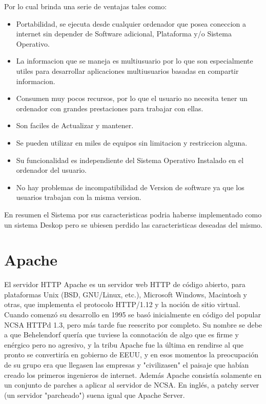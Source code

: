 Por lo cual brinda una serie de ventajas tales como:

\begin{itemize}
    \item Portabilidad, se ejecuta desde cualquier ordenador que posea coneccion a internet sin
        depender de Software adicional, Plataforma y/o Sistema Operativo.
    \item La informacion que se maneja es multiusuario por lo que son especialmente utiles para
        desarrollar aplicaciones multiusuarios basadas en compartir informacion.
    \item Consumen muy pocos recursos, por lo que el usuario no necesita tener un ordenador con 
        grandes prestaciones para trabajar con ellas.
    \item Son faciles de Actualizar y mantener.
    \item Se pueden utilizar en miles de equipos sin limitacion y restriccion alguna.
    \item Su funcionalidad es independiente del Sistema Operativo Instalado en el ordenador del 
            usuario.
    \item No hay problemas de incompatibilidad de Version de software ya que los usuarios trabajan 
        con la misma version.
\end{itemize}
En resumen el Sistema por sus caracteristicas podria haberse implementado como un sistema
Deskop pero se ubiesen perdido las caracteristicas deseadas del mismo.


\section{Apache}

El servidor HTTP Apache es un servidor web HTTP de código abierto, para plataformas
Unix (BSD, GNU/Linux, etc.), Microsoft Windows, Macintosh y otras, que implementa
el protocolo HTTP/1.12 y la noción de sitio virtual. Cuando comenzó su desarrollo en 1995 se basó inicialmente
en código del popular NCSA HTTPd 1.3, pero más tarde fue reescrito por completo. Su nombre se
debe a que Behelendorf quería que tuviese la connotación de algo que es firme
y enérgico pero no agresivo, y la tribu Apache fue la última en rendirse al que pronto se
convertiría en gobierno de EEUU, y en esos momentos la preocupación de su grupo era que
llegasen las empresas y "civilizasen" el paisaje que habían creado los primeros ingenieros de internet.
Además Apache consistía solamente en un conjunto de parches a aplicar al servidor de NCSA.
En inglés, a patchy server (un servidor "parcheado") suena igual que Apache Server. 

